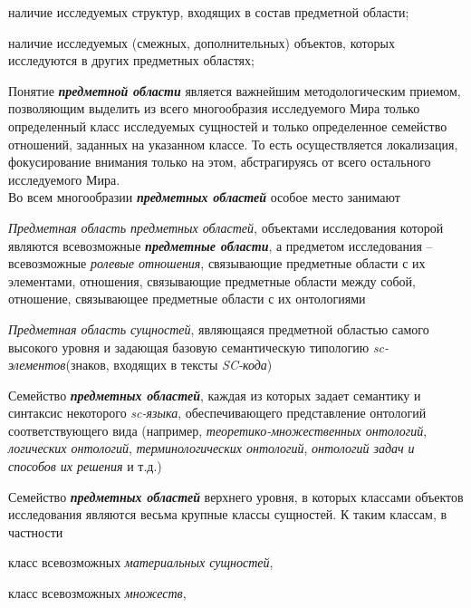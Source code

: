 \begin{SCn}
\begin{scnsubstruct}
\begin{scnsubstruct}
{\begin{scnitemize}
                    \item наличие исследуемых структур, входящих в состав предметной области;
                    \item наличие исследуемых (смежных, дополнительных) объектов, которых исследуются в других предметных областях;
                \end{scnitemize}
                Понятие \textbf{\textit{предметной области}} является важнейшим методологическим приемом, позволяющим выделить из всего многообразия исследуемого Мира только определенный класс исследуемых сущностей и только определенное семейство отношений, заданных на указанном классе. То есть осуществляется локализация, фокусирование внимания только на этом, абстрагируясь от всего остального исследуемого Мира.\\
                Во всем многообразии \textbf{\textit{предметных областей}} особое место занимают
                \begin{scnitemize}
                    \item \textit{Предметная область предметных областей}, объектами исследования которой являются всевозможные \textbf{\textit{предметные области}}, а предметом исследования -- всевозможные \textit{ролевые отношения}, связывающие предметные области с их элементами, отношения, связывающие предметные области между собой, отношение, связывающее предметные области с их онтологиями
                    \item \textit{Предметная область сущностей}, являющаяся предметной областью самого высокого уровня и задающая базовую семантическую типологию \textit{sc-элементов}(знаков, входящих в тексты \textit{SC-кода})
                    \item Семейство \textbf{\textit{предметных областей}}, каждая из которых задает семантику и синтаксис некоторого \textit{sc-языка}, обеспечивающего представление онтологий соответствующего вида (например, \textit{теоретико-множественных онтологий}, \textit{логических онтологий}, \textit{терминологических онтологий}, \textit{онтологий задач и способов их решения} и т.д.)
                    \item Семейство \textbf{\textit{предметных областей}} верхнего уровня, в которых классами объектов исследования являются весьма крупные классы сущностей. К таким классам, в частности
                    \begin{scnitemizeii}
                        \item класс всевозможных \textit{материальных сущностей},
                        \item класс всевозможных \textit{множеств},

\end{scnitemizeii}
\end{scnitemize}}
\end{scnsubstruct}
\end{scnsubstruct}
\end{SCn}
